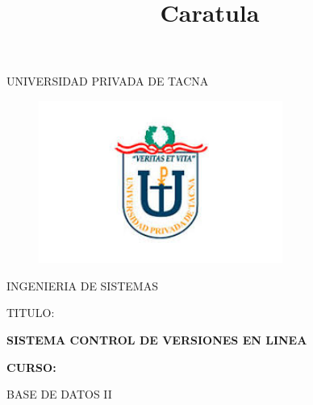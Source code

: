 \documentclass[12pt,letterpaper]{article}
\begin{document}
%


\title{Caratula}

\begin{titlepage}
\begin{center}
\large{UNIVERSIDAD PRIVADA DE TACNA}\\
\vspace*{-0.025in}
\begin{figure}[htb]
\begin{center}
\includegraphics[width=8cm]{./Imagenes/logo}
\end{center}
\end{figure}
\vspace*{0.15in}
INGENIERIA DE SISTEMAS  \\

\vspace*{0.5in}
\begin{large}
TITULO:\\
\end{large}

\vspace*{0.1in}
\begin{Large}
\textbf{SISTEMA CONTROL DE VERSIONES EN LINEA} \\
\end{Large}

\vspace*{0.3in}
\begin{Large}
\textbf{CURSO:} \\
\end{Large}

\vspace*{0.1in}
\begin{large}
BASE DE DATOS II\\
\end{large}


\end{center}
\end{titlepage}
\end{document}

